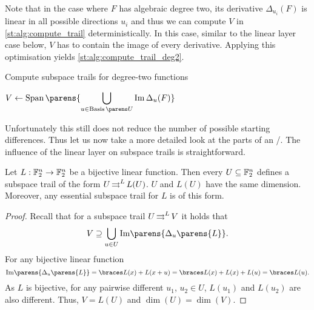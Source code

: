 Note that in the case where $F$ has algebraic degree two, its derivative $\Delta_{u_i}(F)$ is linear in all possible directions $u_i$ and thus we can compute $V$ in \cref{st:alg:compute_trail} deterministically.
In this case, similar to the linear layer case below, $V$ has to contain the image of every derivative.
Applying this optimisation yields \cref{st:alg:compute_trail_deg2}.
\begin{algorithm}
\caption{Compute subspace trails for degree-two functions}\label{st:alg:compute_trail_deg2}
\begin{algorithmic}[1]
    \Statex{}
        \State{}
    \EndIf{}
    \State{} $\displaystyle V \leftarrow \SpanOp\parens{\bigcup_{u \in \Basis{U}} \Im{\Delta_{u}(F)}}$
    \State{}
    \EndFunction{}
\end{algorithmic}
\end{algorithm}

Unfortunately this still does not reduce the number of possible starting differences.
Thus let us now take a more detailed look at the parts of an \SPN/.
The influence of the linear layer on subspace trails is straightforward.
\begin{proposition}\label{st:prop:llayer_st}
    Let $L : \mathbb{F}_2^n \to \mathbb{F}_2^n$ be a bijective linear function.
    Then every $U \subseteq \mathbb{F}_2^n$ defines a subspace trail of the form $U \operatorname*{\rightrightarrows}^{L}_{} L(U)$.
    $U$ and $L(U)$ have the same dimension.
    Moreover, any essential subspace trail for $L$ is of this form.
\end{proposition}

\begin{proof}
    Recall that for a subspace trail $U \operatorname*{\rightrightarrows}^{L}_{} V$ it holds that
    \begin{equation*}
        V \supseteq \bigcup_{u \in U} \mathrm{Im}\parens{\Delta_{u}\parens{L}}.
    \end{equation*}
    For any bijective linear function
    \begin{equation*}
        \mathrm{Im}\parens{\Delta_{u}\parens{L}} = \set{L(x) + L(x + u)} = \set{L(x) + L(x) + L(u)} = \set{L(u)}.
    \end{equation*}
    As $L$ is bijective, for any pairwise different $u_1$, $u_2 \in U$, $L(u_1)$ and $L(u_2)$ are also different.
    Thus, $V = L(U)$ and $\dim(U) = \dim(V)$.
\end{proof}


